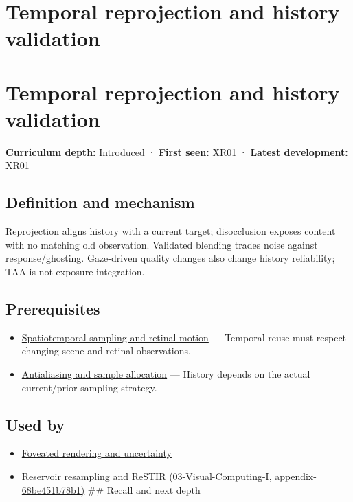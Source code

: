 \hypertarget{appendix-0727340a4428}{}
\section*{Temporal reprojection and history validation}
\section{Temporal reprojection and history validation}\label{temporal-reprojection-and-history-validation}

\textbf{Curriculum depth:} Introduced · \textbf{First seen:} XR01 · \textbf{Latest development:} XR01

\subsection{Definition and mechanism}\label{definition-and-mechanism}

Reprojection aligns history with a current target; disocclusion exposes content with no matching old observation. Validated blending trades noise against response/ghosting. Gaze-driven quality changes also change history reliability; TAA is not exposure integration.

\subsection{Prerequisites}\label{prerequisites}

\begin{itemize}
\tightlist
\item
  \hyperref[appendix-70895739febb]{Spatiotemporal sampling and retinal motion} --- Temporal reuse must respect changing scene and retinal observations.
\item
  \hyperref[appendix-4192b2bdd21e]{Antialiasing and sample allocation} --- History depends on the actual current/prior sampling strategy.
\end{itemize}

\subsection{Used by}\label{used-by}

\begin{itemize}
\item
  \hyperref[appendix-5878b813b732]{Foveated rendering and uncertainty}
\item
  \href{}{Reservoir resampling and ReSTIR (03-Visual-Computing-I, appendix-68be451b78b1)} \#\# Recall and next depth
\end{itemize}

